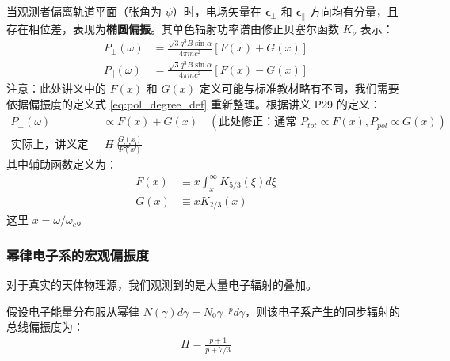 当观测者偏离轨道平面（张角为 $\psi$）时，电场矢量在 $\boldsymbol{\epsilon}_{\perp}$ 和 $\boldsymbol{\epsilon}_{\parallel}$ 方向均有分量，且存在相位差，表现为\textbf{椭圆偏振}。其单色辐射功率谱由修正贝塞尔函数 $K_\nu$ 表示：
\begin{align}
    P_{\perp}(\omega) &= \frac{\sqrt{3}q^3 B \sin\alpha}{4\pi m c^2} [F(x) + G(x)] \\
    P_{\parallel}(\omega) &= \frac{\sqrt{3}q^3 B \sin\alpha}{4\pi m c^2} [F(x) - G(x)]
\end{align}
注意：此处讲义中的 $F(x)$ 和 $G(x)$ 定义可能与标准教材略有不同，我们需要依据偏振度的定义式 \eqref{eq:pol_degree_def} 重新整理。根据讲义 P29 的定义：
\begin{align}
    P_{\perp}(\omega) &\propto F(x) + G(x) \quad (\text{此处修正：通常 } P_{tot} \propto F(x), P_{pol} \propto G(x)) \\
    \text{实际上，讲义定义：} \quad \Pi(\omega) &= \frac{G(x)}{F(x)} 
\end{align}
其中辅助函数定义为：
\begin{align}
    F(x) &\equiv x \int_x^{\infty} K_{5/3}(\xi) d\xi \\
    G(x) &\equiv x K_{2/3}(x)
\end{align}
这里 $x = \omega / \omega_c$。

\subsubsection{幂律电子系的宏观偏振度}

对于真实的天体物理源，我们观测到的是大量电子辐射的叠加。


\begin{theorem}[幂律谱的偏振度]
假设电子能量分布服从幂律 $N(\gamma) d\gamma = N_0 \gamma^{-p} d\gamma$，则该电子系产生的同步辐射的总线偏振度为：
\begin{align}
    \Pi = \frac{p+1}{p+7/3}
\end{align}
\end{theorem}

